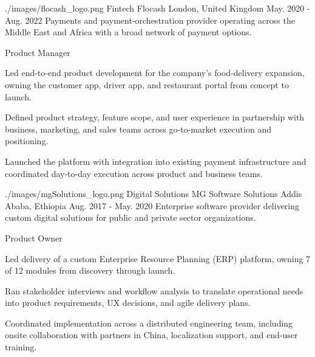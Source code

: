 \begin{cventries}
  \cventrywithlogo
    {./images/flocash_logo.png} %
    {Fintech} %
    {Flocash} %
    {London, United Kingdom} %
    {May. 2020 - Aug. 2022} %
    {Payments and payment-orchestration provider operating across the Middle East and Africa with a broad network of payment options.}
    {
      \begin{cvsubentries}
       \cvsubentry
          {Product Manager}
          {}
          {
            \begin{cvitems} %
              \item {Led end-to-end product development for the company's food-delivery expansion, owning the customer app, driver app, and restaurant portal from concept to launch.}
              \item {Defined product strategy, feature scope, and user experience in partnership with business, marketing, and sales teams across go-to-market execution and positioning.}
              \item {Launched the platform with integration into existing payment infrastructure and coordinated day-to-day execution across product and business teams.}
            \end{cvitems}
          }
      \end{cvsubentries}
    }


  \cventrywithlogo
    {./images/mgSolutions_logo.png} %
    {Digital Solutions} %
    {MG Software Solutions} %
    {Addis Ababa, Ethiopia} %
    {Aug. 2017 - May. 2020} %
    {Enterprise software provider delivering custom digital solutions for public and private sector organizations.}
    {
      \begin{cvsubentries}
       \cvsubentry
          {Product Owner}
          {}
          {
            \begin{cvitems} %
              \item {Led delivery of a custom Enterprise Resource Planning (ERP) platform, owning 7 of 12 modules from discovery through launch.}
              \item {Ran stakeholder interviews and workflow analysis to translate operational needs into product requirements, UX decisions, and agile delivery plans.}
              \item {Coordinated implementation across a distributed engineering team, including onsite collaboration with partners in China, localization support, and end-user training.}
            \end{cvitems}
          }
      \end{cvsubentries}
    }

\end{cventries}
